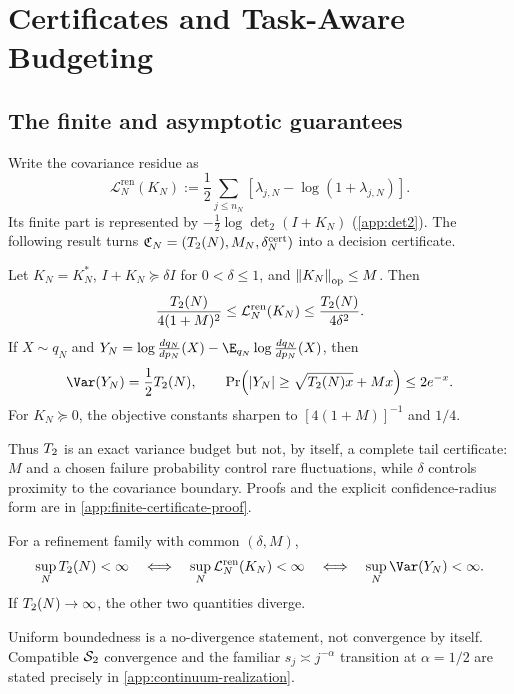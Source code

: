\section{Certificates and Task-Aware Budgeting}
\label{sec:method-theory}

\subsection{The finite and asymptotic guarantees}

Write the covariance residue as
\begin{equation}
  \mathcal L_N^{\mathrm{ren}}(K_N)
  :=\frac12\sum_{j\le n_N}
    [\lambda_{j,N}-\log(1+\lambda_{j,N})].
  \label{eq:renormalized-objective}
\end{equation}
Its finite part is represented by $-\frac12\log\det_2(I+K_N)$
(\cref{app:det2}). The following result turns
$\mathfrak C_N=(T_2(N),M_N,\delta_N^{\mathrm{cert}})$ into a decision
certificate.

\begin{theorem}
\label{thm:finite-certificate}
Let $K_N=K_N^\ast$, $I+K_N\succeq\delta I$ for $0<\delta\le1$, and
$\left\lVert K_N \right\rVert_{\mathrm{op}}\le M$. Then
\begin{equation}
  \frac{T_2(N)}{4(1+M)^2}
  \le \mathcal L_N^{\mathrm{ren}}(K_N)
  \le \frac{T_2(N)}{4\delta^2}.
  \label{eq:kl-t2-equivalence}
\end{equation}
If $X\sim q_N$ and
$Y_N=\log\frac{dq_N}{dp_N}(X)
-\E_{q_N}\log\frac{dq_N}{dp_N}(X)$, then
\begin{equation}
  \Var(Y_N)=\frac12\Ttwo(N),\qquad
  \Pr\!\left(
    |Y_N|\ge\sqrt{\Ttwo(N)x}+Mx
  \right)\le2e^{-x}.
  \label{eq:log-density-variance}
\end{equation}
For $K_N\succeq0$, the objective constants sharpen to
$[4(1+M)]^{-1}$ and $1/4$.
\end{theorem}

Thus $T_2$ is an exact variance budget but not, by itself, a complete tail
certificate: $M$ and a chosen failure probability control rare fluctuations,
while $\delta$ controls proximity to the covariance boundary. Proofs and the
explicit confidence-radius form are in
\cref{app:finite-certificate-proof}.

\begin{theorem}
\label{thm:s2-stability}
For a refinement family with common $(\delta,M)$,
\begin{equation}
  \sup_N\Ttwo(N)<\infty
  \quad\Longleftrightarrow\quad
  \sup_N\mathcal L_N^{\mathrm{ren}}(K_N)<\infty
  \quad\Longleftrightarrow\quad
  \sup_N\Var(Y_N)<\infty.
  \label{eq:s2-threshold}
\end{equation}
If $T_2(N)\to\infty$, the other two quantities diverge.
\end{theorem}
Uniform boundedness is a no-divergence statement, not convergence by itself.
Compatible $\mathcal{S}_{2}$ convergence and the familiar
$s_j\asymp j^{-\alpha}$ transition at $\alpha=1/2$ are stated precisely in
\cref{app:continuum-realization}.

